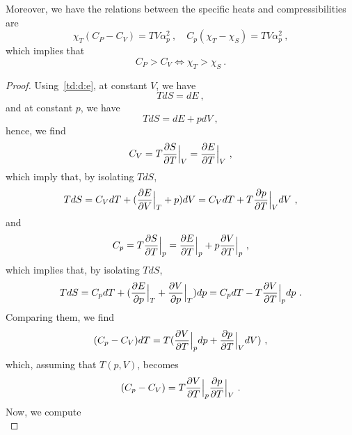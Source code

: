     Moreover, we have the relations between the specific heats and compressibilities are
    \begin{equation*}
        \chi_T (C_P - C_V) = T V \alpha_p^2 ~, \quad C_p (\chi_T - \chi_S) = T V \alpha_p^2 ~,
    \end{equation*}
    which implies that 
    \begin{equation*}
        C_P > C_V \iff \chi_T > \chi_S ~.
    \end{equation*}
    \begin{proof}
        Using~\eqref{td:d:e}, at constant $V$, we have
        \begin{equation*}
            T dS = dE ~,
        \end{equation*}
        and at constant $p$, we have
        \begin{equation*}
            T dS = dE + p dV ~,
        \end{equation*}
        hence, we find
        \begin{equation*}
            C_V = T \frac{\partial S}{\partial T} \Big \vert_V = \frac{\partial E}{\partial T} \Big \vert_V ~,
        \end{equation*}
        which imply that, by isolating $TdS$,
        \begin{equation*}
            T dS = C_V dT + ( \frac{\partial E}{\partial V} \Big \vert_{T} + p) dV = C_V dT + T \frac{\partial p}{\partial T} \Big \vert_V dV ~,
        \end{equation*}
        and 
        \begin{equation*}
            C_p = T \frac{\partial S}{\partial T} \Big \vert_p = \frac{\partial E}{\partial T} \Big \vert_p + p \frac{\partial V}{\partial T} \Big \vert_p  ~,
        \end{equation*}
        which implies that, by isolating $TdS$,
        \begin{equation*}
            T dS = C_p dT + ( \frac{\partial E}{\partial p} \Big \vert_T + \frac{\partial V}{\partial p} \Big \vert_T ) dp = C_p dT - T \frac{\partial V}{\partial T} \Big \vert_p dp ~.
        \end{equation*}
        Comparing them, we find 
        \begin{equation*}
            (C_p - C_V) dT = T (\frac{\partial V}{\partial T} \Big \vert_p dp + \frac{\partial p}{\partial T} \Big \vert_V dV) ~,
        \end{equation*}
        which, assuming that $T(p, V)$, becomes
        \begin{equation*}
            (C_p - C_V) = T \frac{\partial V}{\partial T} \Big \vert_p \frac{\partial p}{\partial T} \Big \vert_V ~.
        \end{equation*}
        Now, we compute
        \begin{equation*}

\end{equation*}
\end{proof}
